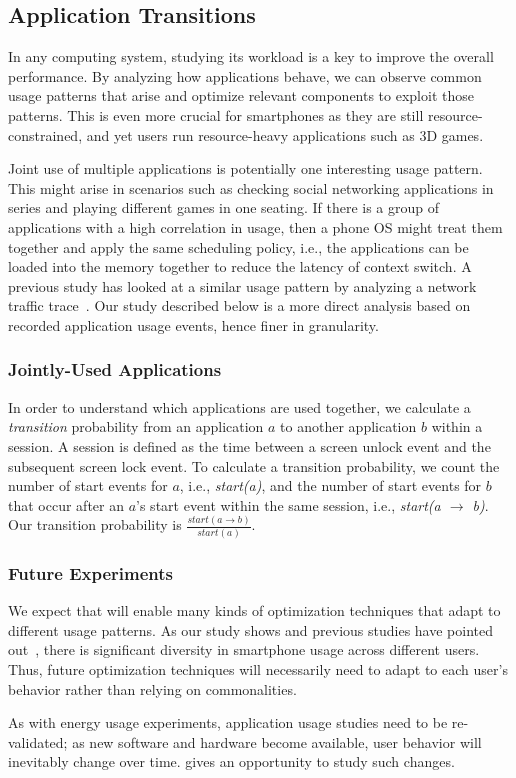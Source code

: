 \subsection{Application Transitions}
\label{subsec-apptransitions}

In any computing system, studying its workload is a key to improve the overall
performance. By analyzing how applications behave, we can observe common usage
patterns that arise and optimize relevant components to exploit those patterns.
This is even more crucial for smartphones as they are still
resource-constrained, and yet users run resource-heavy applications such as 3D
games.

Joint use of multiple applications is potentially one interesting usage pattern.
This might arise in scenarios such as checking social networking applications in
series and playing different games in one seating. If there is a group of
applications with a high correlation in usage, then a phone OS might treat them
together and apply the same scheduling policy, i.e., the applications can be
loaded into the memory together to reduce the latency of context switch.
A previous study has looked at a similar usage pattern by analyzing a network
traffic trace~\cite{xu:imc:2011}. Our study described below is a more direct
analysis based on recorded application usage events, hence finer in granularity.

\subsubsection{Jointly-Used Applications}
In order to understand which applications are used together, we calculate a {\it
transition} probability from an application $a$ to another application $b$
within a session. A session is defined as the time between a screen unlock event
and the subsequent screen lock event. To calculate a transition probability, we
count the number of start events for $a$, i.e., {\it start(a)}, and the number
of start events for $b$ that occur after an $a$'s start event within the same
session, i.e., {\it start(a $\rightarrow$ b)}. Our transition probability is
$\frac{start(a \rightarrow b)}{start(a)}$.

\subsubsection{Future Experiments}

We expect that \PhoneLab{} will enable many kinds of optimization techniques
that adapt to different usage patterns. As our study shows and previous studies
have pointed out~\cite{falaki:mobisys:2010, shye:micro:2009}, there is
significant diversity in smartphone usage across different users. Thus, future
optimization techniques will necessarily need to adapt to each user's behavior
rather than relying on commonalities.

As with energy usage experiments, application usage studies need to be
re-validated; as new software and hardware become available, user behavior will
inevitably change over time. \PhoneLab{} gives an opportunity to study such
changes.
